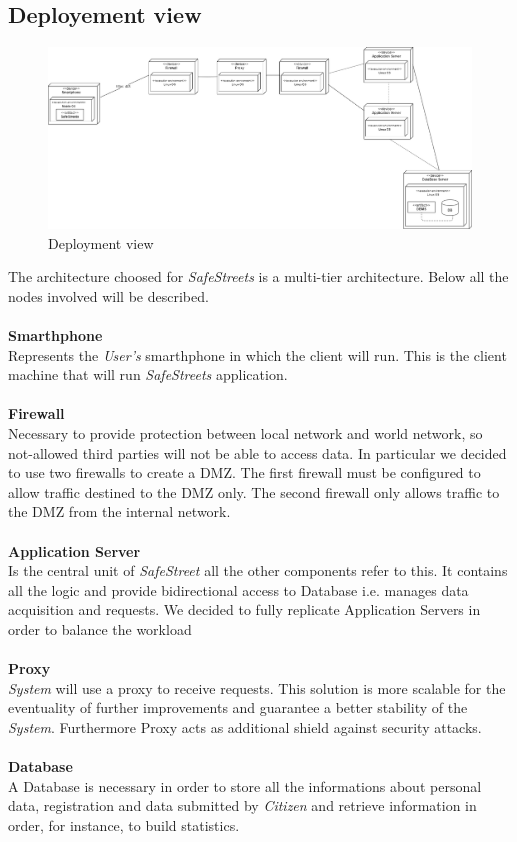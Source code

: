 \documentclass{article}
\begin{document}
\clearpage

\subsection{Deployement view}
\begin{figure}[H]
    \centering
    \includegraphics[scale=0.3]{img/Deployment_component.png}
    \caption{Deployment view}
\end{figure}  
The architecture choosed for \textit{SafeStreets} is a multi-tier architecture. Below all the nodes 
involved will be described.
\\
\\
\textbf{Smarthphone}\\
Represents the \textit{User's} smarthphone in which the client will run. This is the client machine
that will run \textit{SafeStreets} application.
\\
\\
\textbf{Firewall}\\
Necessary to provide protection between local network and world network, so not-allowed third 
parties will not be able to access data. In particular we decided to use two firewalls to create a DMZ. 
The first firewall must be configured to allow traffic destined to the DMZ only. The second firewall 
only allows traffic to the DMZ from the internal network.
\\
\\
\textbf{Application Server}\\
Is the central unit of \textit{SafeStreet} all the other components refer to this. It 
contains all the logic and provide bidirectional access to Database i.e. manages data 
acquisition and requests. We decided to fully replicate Application Servers in order 
to balance the workload 
\\
\\
\textbf{Proxy}\\
\textit{System} will use a proxy to receive requests. This solution is more scalable 
for the eventuality of further improvements and guarantee a better stability of 
the \textit{System}. Furthermore Proxy acts as additional shield against security attacks.  
\\
\\
\textbf{Database}\\
A Database is necessary in order to store all the informations about personal data, 
registration and data submitted by \textit{Citizen} and retrieve information in order, 
for instance, to build statistics.
\end{document}

